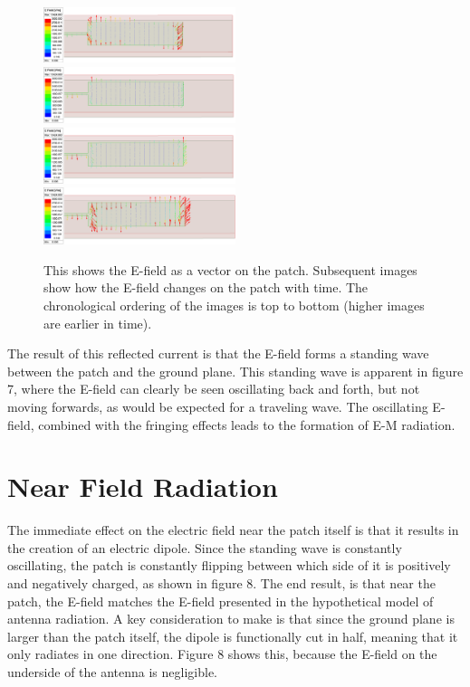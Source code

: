 \documentclass[12pt]{article}
\begin{document}
\begin{figure}[h]
    \centering
    \includegraphics[width=0.5\textwidth]{E-field-onPatch-t0.png}
    \includegraphics[width=0.5\textwidth]{E-field-onPatch-t1.png}
    \includegraphics[width=0.5\textwidth]{E-field-onPatch-t2.png}
    \includegraphics[width=0.5\textwidth]{E-field-onPatch-t3.png}
    \caption{This shows the E-field as a vector on the patch. Subsequent images show how the E-field changes on the patch with time. The chronological ordering of the images is top to bottom (higher images are earlier in time).}
\end{figure}

The result of this reflected current is that the E-field forms a standing wave between the patch and the ground plane. This standing wave is apparent in figure 7, where the E-field can clearly be seen oscillating back and forth, but not moving forwards, as would be expected for a traveling wave. The oscillating E-field, combined with the fringing effects leads to the formation of E-M radiation.

\section{Near Field Radiation}

The immediate effect on the electric field near the patch itself is that it results in the creation of an electric dipole. Since the standing wave is constantly oscillating, the patch is constantly flipping between which side of it is positively and negatively charged, as shown in figure 8. The end result, is that near the patch, the E-field matches the E-field presented in the hypothetical model of antenna radiation. A key consideration to make is that since the ground plane is larger than the patch itself, the dipole is functionally cut in half, meaning that it only radiates in one direction. Figure 8 shows this, because the E-field on the underside of the antenna is negligible.
\end{document}
